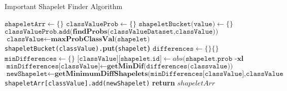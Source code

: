 \documentclass{article}
\begin{document}
\begin{algorithm}
  \caption{Important Shapelet Finder Algorithm}\label{shapeletFInder}
  \begin{algorithmic}[1]
     \State $\texttt{shapeletArr} \gets \{\}$
     \State $\texttt{classValueProb} \gets \{\}$
     \State $\texttt{shapeletBucket(value)} \gets \{\}$
     \State $\texttt{classValueProb.add(}  \textbf{findProbs(}\texttt{classValueDataset,classValue))}$
     \EndFor
     \State $\texttt{classValue} \gets \textbf{maxProbClassVal(} \texttt{shapelet} \textbf{)}$
     \State \texttt{shapeletBucket(classValue).}\textbf{put(}\texttt{shapelet}\textbf{)}
     \EndFor
     \State $\texttt{differences} \gets \{\} \{\}$
     \State $\texttt{minDifferences} \gets \{\}$
     	\State $\texttt{[classValue][shapelet.id]} \gets \textbf{}{abs(} \texttt{shapelet.prob -} \textbf{xl}$
     \EndFor
     \State $\texttt{minDifferences[classValue]} \gets \textbf{getMinDif(}\texttt{differences(classvalue))}$
     \State $\texttt{newShapelet} \gets \textbf{getMinimumDiffShapelets(}\texttt{minDifferences[classValue],classValue}\textbf{}$
     \State \texttt{shapeletArr[classValue].add(newShapelet)}
     \EndFor
      \State \textbf{return} $shapeletArr$
    \EndProcedure
  \end{algorithmic}
\end{algorithm}
\end{document}
